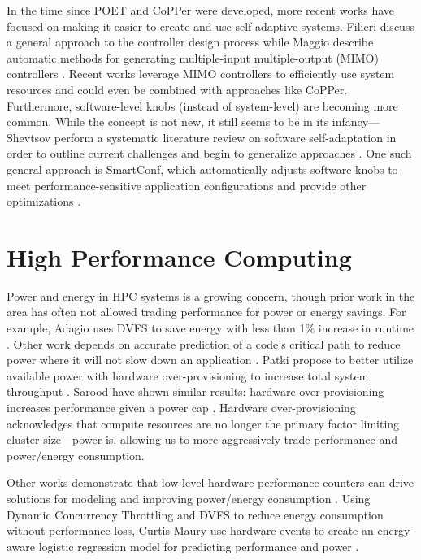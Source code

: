 In the time since POET and CoPPer were developed, more recent works have focused on making it easier to create and use self-adaptive systems.
Filieri \etal discuss a general approach to the controller design process \cite{Filieri2017} while Maggio \etal describe automatic methods for generating multiple-input multiple-output (MIMO) controllers \cite{Maggio2017}.
Recent works leverage MIMO controllers to efficiently use system resources \cite{josep-isca2016,SPECTR} and could even be combined with approaches like CoPPer.
Furthermore, software-level knobs (instead of system-level) are becoming more common.
While the concept is not new, it still seems to be in its infancy---Shevtsov \etal perform a systematic literature review on software self-adaptation in order to outline current challenges and begin to generalize approaches \cite{Shevtsov2017}.
One such general approach is SmartConf, which automatically adjusts software knobs to meet performance-sensitive application configurations and provide other optimizations \cite{SmartConf}.


\section{High Performance Computing}

Power and energy in HPC systems is a growing concern, though prior work in the area has often not allowed trading performance for power or energy savings.
For example, Adagio uses DVFS to save energy with less than 1\% increase in runtime \cite{RountreeAdagio}.
Other work depends on accurate prediction of a code's critical path to reduce power where it will not slow down an application \cite{Jitter,Marathe2015}.
Patki \etal propose to better utilize available power with hardware over-provisioning to increase total system throughput \cite{PatkiRMAP}.
Sarood \etal have shown similar results: hardware over-provisioning increases performance given a power cap \cite{Sarood2013}.
Hardware over-provisioning acknowledges that compute resources are no longer the primary factor limiting cluster size---power is, allowing us to more aggressively trade performance and power/energy consumption.

Other works demonstrate that low-level hardware performance counters can drive solutions for modeling and improving power/energy consumption \cite{Libutti2014,Sasaki,Chetsa,WuHPCComputer}.
Using Dynamic Concurrency Throttling and DVFS to reduce energy consumption without performance loss, Curtis-Maury \etal use hardware events to create an energy-aware logistic regression model for predicting performance and power \cite{Curtis-Maury2008}.

